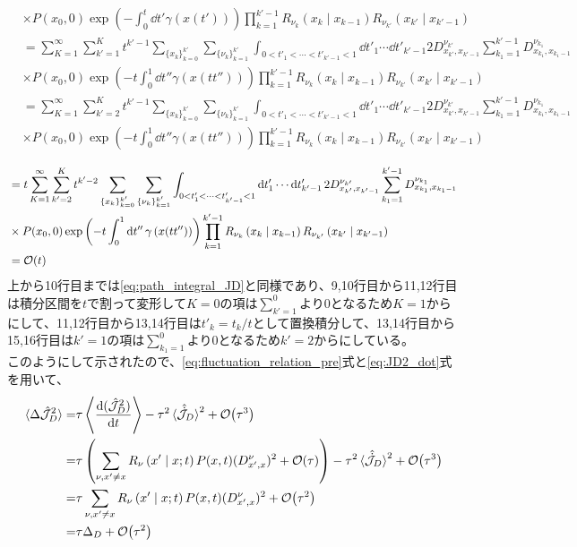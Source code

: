 \documentclass{ltjsarticle}
\begin{document}
\begin{align}
  &\times P(x_0,0)\exp\left(-\int_0^{t} \dd{t'}\gamma\left(x(t')\right)\right)\prod_{k=1}^{k'-1} R_{\nu_k}\left(x_k\mid x_{k-1}\right)R_{\nu_{k'}}\left(x_{k'}\mid x_{k'-1}\right)\\
  &=\sum_{K=1}^{\infty}\sum_{k'=1}^K t^{k'-1}\sum_{\lbrace x_k\rbrace_{k=0}^{k'}}\sum_{\lbrace\nu_k\rbrace_{k=1}^{k'}}\int_{0<t'_1<\cdots<t'_{k'-1}<1}\dd{t'_1}\cdots\dd{t'_{k'-1}}2D^{\nu_{k'}}_{x_{k'},x_{k'-1}}\sum_{k_1=1}^{k'-1}D^{\nu_{k_1}}_{x_{k_1},x_{k_1-1}} \\
  &\times P(x_0,0)\exp\left(-t\int_0^1 \dd{t''}\gamma\left(x(tt'')\right)\right)\prod_{k=1}^{k'-1} R_{\nu_k}\left(x_k\mid x_{k-1}\right)R_{\nu_{k'}}\left(x_{k'}\mid x_{k'-1}\right)\\
  &=\sum_{K=1}^{\infty}\sum_{k'=2}^K t^{k'-1}\sum_{\lbrace x_k\rbrace_{k=0}^{k'}}\sum_{\lbrace\nu_k\rbrace_{k=1}^{k'}}\int_{0<t'_1<\cdots<t'_{k'-1}<1}\dd{t'_1}\cdots\dd{t'_{k'-1}}2D^{\nu_{k'}}_{x_{k'},x_{k'-1}}\sum_{k_1=1}^{k'-1}D^{\nu_{k_1}}_{x_{k_1},x_{k_1-1}} \\
  &\times P(x_0,0)\exp\left(-t\int_0^1 \dd{t''}\gamma\left(x(tt'')\right)\right)\prod_{k=1}^{k'-1} R_{\nu_k}\left(x_k\mid x_{k-1}\right)R_{\nu_{k'}}\left(x_{k'}\mid x_{k'-1}\right)\\
  \end{align}
  \begin{align}
  &=t\sum_{K=1}^{\infty}\sum_{k'=2}^K t^{k'-2}\sum_{\lbrace x_k\rbrace_{k=0}^{k'}}\sum_{\lbrace\nu_k\rbrace_{k=1}^{k'}}\int_{0<t'_1<\cdots<t'_{k'-1}<1}\dd{t'_1}\cdots\dd{t'_{k'-1}}2D^{\nu_{k'}}_{x_{k'},x_{k'-1}}\sum_{k_1=1}^{k'-1}D^{\nu_{k_1}}_{x_{k_1},x_{k_1-1}} \\
  &\times P(x_0,0)\exp\left(-t\int_0^1 \dd{t''}\gamma\left(x(tt'')\right)\right)\prod_{k=1}^{k'-1} R_{\nu_k}\left(x_k\mid x_{k-1}\right)R_{\nu_{k'}}\left(x_{k'}\mid x_{k'-1}\right)\\
  &=\order{t}
  \label{eq:order_t}
\end{align}
上から10行目までは\eqref{eq:path_integral_JD}と同様であり、9,10行目から11,12行目は積分区間を$t$で割って変形して$K=0$の項は$\sum^0_{k'=1}$より$0$となるため$K=1$からにして、11,12行目から13,14行目は$t'_k=t_k/t$として置換積分して、13,14行目から15,16行目は$k'=1$の項は$\sum^0_{k_1=1}$より$0$となるため$k'=2$からにしている。\\
このようにして示されたので、\eqref{eq:fluctuation_relation_pre}式と\eqref{eq:JD2_dot}式を用いて、
\begin{align}
  \ev*{\Delta\hat{\mathcal{J}}_D^2}=&\tau\ev{\dv{(\hat{\mathcal{J}}_D^2)}{t}}-\tau^2\ev*{\hat{\dot{\mathcal{J}}}_D}^2+\order{\tau^3}\\
  =&\tau\left( \sum_{\nu,x'\neq x}R_{\nu}\left(x'\mid x;t\right)P(x,t)(D^{\nu}_{x',x})^2+\order{\tau} \right) -\tau^2\ev*{\hat{\dot{\mathcal{J}}}_D}^2+\order{\tau^3}\\
  =&\tau\sum_{\nu,x'\neq x}R_{\nu}\left(x'\mid x;t\right)P(x,t)(D^{\nu}_{x',x})^2+\order{\tau^2}\\
  =&\tau\Delta_D+\order{\tau^2}\\
  \label{eq:fluctuation}
\end{align}
\end{document}

